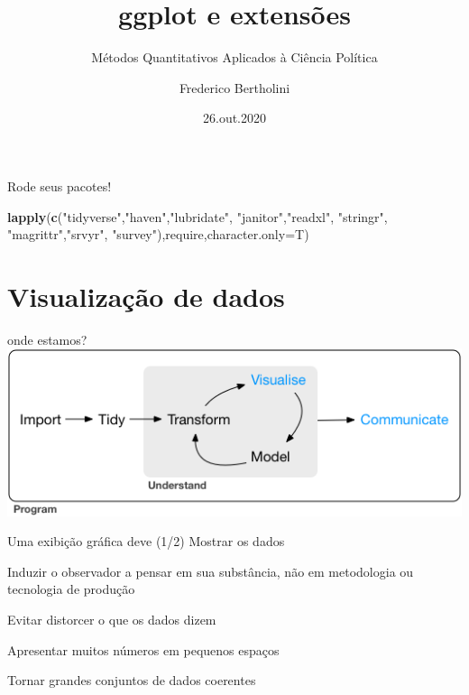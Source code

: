 \documentclass[
  9pt,
  ignorenonframetext,
]{beamer}
\title{ggplot e extensões}
\subtitle{Métodos Quantitativos Aplicados à Ciência Política}
\author{Frederico Bertholini}
\date{26.out.2020}
\newenvironment{Shaded}{\begin{snugshade}}{\end{snugshade}}
\newcommand{\DataTypeTok}[1]{\textcolor[rgb]{0.13,0.29,0.53}{#1}}
\newcommand{\KeywordTok}[1]{\textcolor[rgb]{0.13,0.29,0.53}{\textbf{#1}}}
\newcommand{\NormalTok}[1]{#1}
\newcommand{\StringTok}[1]{\textcolor[rgb]{0.31,0.60,0.02}{#1}}
\begin{document}
\frame{\titlepage}

\begin{frame}[allowframebreaks]
  \tableofcontents[hideallsubsections]
\end{frame}
\begin{frame}[fragile]{Rode seus pacotes!}
\protect\hypertarget{rode-seus-pacotes}{}
\begin{Shaded}
\begin{Highlighting}[]
\KeywordTok{lapply}\NormalTok{(}\KeywordTok{c}\NormalTok{(}\StringTok{"tidyverse"}\NormalTok{,}\StringTok{"haven"}\NormalTok{,}\StringTok{"lubridate"}\NormalTok{,}
         \StringTok{"janitor"}\NormalTok{,}\StringTok{"readxl"}\NormalTok{,}
          \StringTok{"stringr"}\NormalTok{, }\StringTok{"magrittr"}\NormalTok{,}\StringTok{"srvyr"}\NormalTok{,}
         \StringTok{"survey"}\NormalTok{),require,}\DataTypeTok{character.only=}\NormalTok{T)}
\end{Highlighting}
\end{Shaded}
\end{frame}

\hypertarget{visualizauxe7uxe3o-de-dados}{%
\section{Visualização de dados}\label{visualizauxe7uxe3o-de-dados}}

\begin{frame}{onde estamos?}
\protect\hypertarget{onde-estamos}{}
\includegraphics{imgs/data-science-communicate.png}
\end{frame}

\begin{frame}{Uma exibição gráfica deve (1/2)}
\protect\hypertarget{uma-exibiuxe7uxe3o-gruxe1fica-deve-12}{}
Mostrar os dados

Induzir o observador a pensar em sua substância, não em metodologia ou
tecnologia de produção

Evitar distorcer o que os dados dizem

Apresentar muitos números em pequenos espaços

Tornar grandes conjuntos de dados coerentes
\end{frame}
\end{document}
